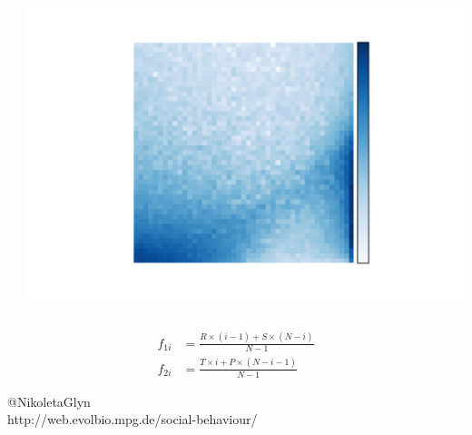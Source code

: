 \documentclass{beamer}
\begin{document}
\begin{frame}
    \begin{columns}
        \begin{column}{.4\textwidth}
            \centering
            
        \end{column}
        \pause
        \begin{column}{.6\textwidth}
            \includegraphics[width=\textwidth]{static/reactive_results.png}
        \end{column}
    \end{columns}
\end{frame}

\begin{frame}
    \begin{align*}
        f_{1i} & = \frac{R \times (i - 1) + S \times (N - i)} {N - 1} \\
        f_{2i} & = \frac{T \times i + P \times (N - i - 1)} {N - 1}
    \end{align*}
\end{frame}

\begin{frame}
    \begin{center}
    \faTwitter @NikoletaGlyn \\
    http://web.evolbio.mpg.de/social-behaviour/
    \end{center}
\end{frame}
\end{document}
